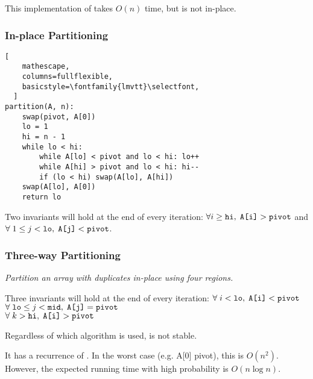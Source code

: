 This implementation of  takes $O(n)$ time, but is not in-place.

\subsubsection{In-place Partitioning}
\begin{lstlisting}[
    mathescape,
    columns=fullflexible,
    basicstyle=\fontfamily{lmvtt}\selectfont,
  ]
partition(A, n):
    swap(pivot, A[0])
    lo = 1
    hi = n - 1
    while lo < hi:
        while A[lo] < pivot and lo < hi: lo++
        while A[hi] > pivot and lo < hi: hi--
        if (lo < hi) swap(A[lo], A[hi])
    swap(A[lo], A[0])
    return lo
\end{lstlisting}

Two invariants will hold at the end of every iteration:\linebreak
 $\forall i \geq \texttt{hi}, \; \texttt{A[i]} > \texttt{pivot}$ and $\forall \; 1 \leq j < \texttt{lo}, \; \texttt{A[j]} < \texttt{pivot}$.

 \subsubsection{Three-way Partitioning}
 \emph{Partition an array with duplicates in-place using four regions.}

Three invariants will hold at the end of every iteration:\linebreak
$\forall \; i < \texttt{lo}, \; \texttt{A[i]} < \texttt{pivot}$\\
$\forall \; \texttt{lo} \leq j < \texttt{mid}, \; \texttt{A[j]} = \texttt{pivot}$\\
$\forall \; k > \texttt{hi}, \; \texttt{A[i]} > \texttt{pivot}$

Regardless of which  algorithm is used,  is not stable.

It has a recurrence of . In the worst case (e.g. A[0] pivot), this is $O(n^2)$.
However, the expected running time with high probability is $O(n \log n)$.